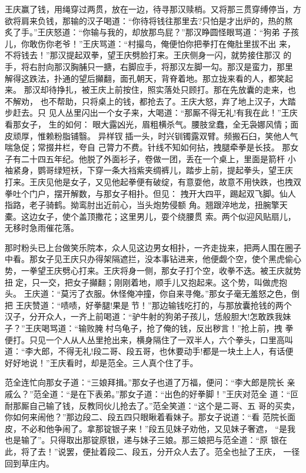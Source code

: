 王庆赢了钱，用绳穿过两贯，放在一边，待寻那汉赎梢。又将那三贯穿缚停当，方
欲将肩来负钱，那输的汉子喝道：“你待将钱往那里去?只怕是才出炉的，热的熬
炙了手。”王庆怒道：“你输与我的，却放那鸟屁？”那汉睁圆怪眼骂道：“狗弟
子孩儿，你敢伤你老爷！”王庆骂道：“村撮鸟，俺便怕你把拳打在俺肚里拔不出
来，不将钱去！”那汉提起双拳，望王庆劈脸打来。王庆侧身一闪，就势接住那汉
的手，将右肘向那汉胸脯只一搪，右脚应手，将那汉左脚一勾。那汉是蛮力，那里
解得这跌法，扑通的望后攧翻，面孔朝天，背脊着地。那立拢来看的人，都笑起来。
那汉却待挣扎，被王庆上前按住，照实落处只顾打。那在先放囊的走来，也不解劝，
也不帮助，只将桌上的钱，都抢去了。王庆大怒，弃了地上汉子，大踏步赶去。只
见人丛里闪出一个女子来，大喝道：“那厮不得无礼!有我在此！”王庆看那女子，
生的如何：
眼大露凶光，眉粗横杀气。腰肢坌蠢，全无袅娜风情；面皮顽厚，惟赖粉脂铺翳。
异样钗插一头，时兴钏镯露双臂。频搬石臼，笑他人气喘急促；常掇井栏，夸自
己膂力不费。针线不知如何拈，拽腿牵拳是长技。
那女子有二十四五年纪。他脱了外面衫子，卷做一团，丢在一个桌上，里面是箭杆
小袖紧身，鹦哥绿短袄，下穿一条大裆紫夹绸裤儿，踏步上前，提起拳头，望王庆
打来。王庆见他是女子，又见他起拳便有破绽，有意耍他，故意不用快跌，也拽双
拳吐个门户，摆开解数，与那女子相扑。但见：
拽开大四平，踢起双飞脚。仙人指路，老子骑鹤。拗鸾肘出近前心，当头炮势侵额
角。翘跟淬地龙，扭腕擎天橐。这边女子，使个盖顶撒花；这里男儿，耍个绕腰贯
索。两个似迎风贴扇儿，无移时急雨催花落。

那时粉头已上台做笑乐院本，众人见这边男女相扑，一齐走拢来，把两人围在圈子
中看。那女子见王庆只办得架隔遮拦，没本事钻进来，他便觑个空，使个黑虎偷心
势，一拳望王庆劈心打来。王庆将身一侧，那女子打个空，收拳不迭。被王庆就势
扭定，只一交，把女子攧翻；刚刚着地，顺手儿又抱起来。这个势，叫做虎抱头。
王庆道：“莫污了衣服。休怪俺冲撞，你自来寻俺。”那女子毫无羞怒之色，倒把
王庆赞道：“啧啧，好拳腿!果是节！”那边输钱吃打的，与那放囊抢钱的两个
汉子，分开众人，一齐上前喝道：“驴牛射的狗弟子孩儿，恁般胆大!怎敢跌我妹
子？”王庆喝骂道：“输败腌村乌龟子，抢了俺的钱，反出秽言！”抢上前，拽
拳便打。只见一个人从人丛里抢出来，横身隔住了一双半人，六个拳头，口里高叫
道：“李大郎，不得无礼!段二哥、段五哥，也休要动手!都是一块土上人，有话便
好好地说！”王庆看时，却是范全。三人真个住了手。

范全连忙向那女子道：“三娘拜揖。”那女子也道了万福，便问：“李大郎是院长
亲戚么？”范全道：“是在下表弟。”那女子道：“出色的好拳脚！”王庆对范全
道：“叵耐那厮自己输了钱，反教同伙儿抢去了。”范全笑道：“这个是二哥、五
哥的买卖，你如何来闹他？”那边段二、段五四只眼瞅着看妹子。那女子说道：“看
范院长面皮，不必和他争闹了。拿那锭银子来！”段五见妹子劝他，又见妹子奢遮，
“是我也是输了”。只得取出那锭原银，递与妹子三娘。那三娘把与范全道：“原
银在此，将了去！”说罢，便扯着段二、段五，分开众人去了。范全也扯了王庆，
一径回到草庄内。

